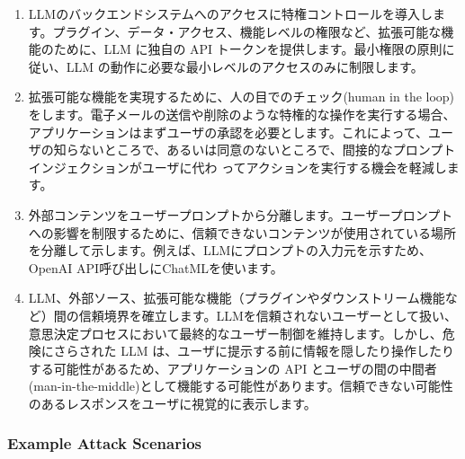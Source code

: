 \documentclass[
]{article}
\providecommand{\tightlist}{%
  \setlength{\itemsep}{0pt}\setlength{\parskip}{0pt}}
\begin{document}
\begin{enumerate}
\def\labelenumi{\arabic{enumi}.}
\tightlist
\item
  LLMのバックエンドシステムへのアクセスに特権コントロールを導入します。プラグイン、データ・アクセス、機能レベルの権限など、拡張可能な機能のために、LLM
  に独自の API トークンを提供します。最小権限の原則に従い、LLM
  の動作に必要な最小レベルのアクセスのみに制限します。
\item
  拡張可能な機能を実現するために、人の目でのチェック(human in the
  loop)をします。電子メールの送信や削除のような特権的な操作を実行する場合、アプリケーションはまずユーザの承認を必要とします。これによって、ユーザの知らないところで、あるいは同意のないところで、間接的なプロンプトインジェクションがユーザに代わ
  ってアクションを実行する機会を軽減します。
\item
  外部コンテンツをユーザープロンプトから分離します。ユーザープロンプトへの影響を制限するために、信頼できないコンテンツが使用されている場所を分離して示します。例えば、LLMにプロンプトの入力元を示すため、OpenAI
  API呼び出しにChatMLを使います。
\item
  LLM、外部ソース、拡張可能な機能（プラグインやダウンストリーム機能など）間の信頼境界を確立します。LLMを信頼されないユーザーとして扱い、意思決定プロセスにおいて最終的なユーザー制御を維持します。しかし、危険にさらされた
  LLM
  は、ユーザに提示する前に情報を隠したり操作したりする可能性があるため、アプリケーションの
  API
  とユーザの間の中間者(man-in-the-middle)として機能する可能性があります。信頼できない可能性のあるレスポンスをユーザに視覚的に表示します。
\end{enumerate}

\subsubsection{Example Attack Scenarios}\label{example-attack-scenarios}
\end{document}
